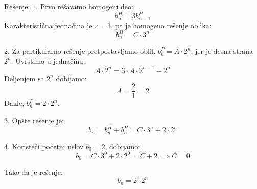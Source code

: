 \documentclass[a4paper,12pt]{article}
\begin{document}
Rešenje:
1. Prvo rešavamo homogeni deo:
\[
b_n^H = 3b_{n-1}^H
\]
Karakteristična jednačina je \(r = 3\), pa je homogeno rešenje oblika:
\[
b_n^H = C \cdot 3^n
\]

2. Za partikularno rešenje pretpostavljamo oblik \(b_n^P = A \cdot 2^n\), jer je desna strana \(2^n\).  
Uvrstimo u jednačinu:
\[
A \cdot 2^n = 3 \cdot A \cdot 2^{n-1} + 2^n
\]
Deljenjem sa \(2^n\) dobijamo:
\[
A = \frac{2}{1} = 2
\]
Dakle, \(b_n^P = 2 \cdot 2^n\).

3. Opšte rešenje je:
\[
b_n = b_n^H + b_n^P = C \cdot 3^n + 2 \cdot 2^n
\]

4. Koristeći početni uslov \(b_0 = 2\), dobijamo:
\[
b_0 = C \cdot 3^0 + 2 \cdot 2^0 = C + 2 \implies C = 0
\]

Tako da je rešenje:
\[
b_n = 2 \cdot 2^n
\]
\end{document}
